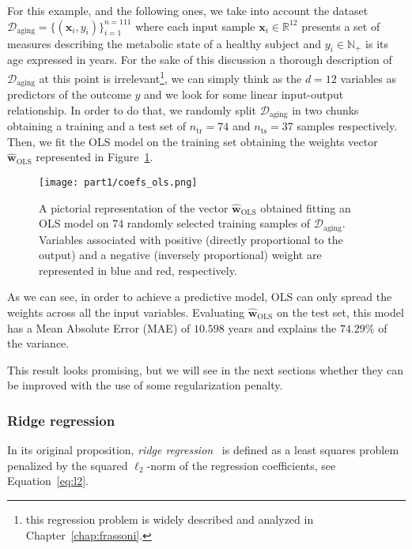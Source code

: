 			For this example, and the following ones, we take into account the dataset $\mathcal{D}_{\text{aging}} = \{(\bm{x}_i, y_i)\}_{i=1}^{n=111}$ where each input sample $\bm{x}_i \in \mathbb{R}^{12}$ presents a set of measures describing the metabolic state of a healthy subject and $y_i \in \mathbb{N}_+$ is its age expressed in years.
			For the sake of this discussion a  thorough description of $\mathcal{D}_{\text{aging}}$ at this point is irrelevant\footnote{this regression problem is widely described and analyzed in Chapter~\ref{chap:frassoni}.}, we can simply think as the $d=12$ variables as predictors of the outcome $y$ and we look for some linear input-output relationship.
			In order to do that, we randomly split $\mathcal{D}_{\text{aging}}$ in two chunks obtaining a training and a test set of $n_{\text{tr}}=74$ and $n_{\text{ts}}=37$ samples respectively. Then, we fit the OLS model on the training set obtaining the weights vector $\bm{\hat w}_{\text{OLS}}$ represented in Figure~\ref{fig:coefs_ols}.
			\begin{figure}[!h]
				\centering
				\texttt{[image: part1/coefs\_ols.png]}
				\caption{A pictorial representation of the vector $\bm{\hat w}_{\text{OLS}}$ obtained fitting an OLS model on $74$ randomly selected training samples of $\mathcal{D}_{\text{aging}}$. Variables associated with positive (\ie directly proportional to the output) and a negative (\ie inversely proportional) weight are represented in blue and red, respectively.} \label{fig:coefs_ols}
		  \end{figure}
			As we can see, in order to achieve a predictive model, OLS can only spread the weights across all the input variables. Evaluating $\bm{\hat w}_{\text{OLS}}$ on the test set, this model has a Mean Absolute Error (\ac{MAE}) of $10.598$ years and explains the $74.29\%$ of the variance.

			This result looks promising, but we will see in the next sections whether they can be improved with the use of some regularization penalty.


			\subsubsection{Ridge regression} \label{sec:ridge_regression}
			In its original proposition, \textit{ridge regression}~\cite{hoerl1970ridge} is defined as a least squares problem penalized by the squared $\ell_2$-norm of the regression coefficients, see Equation~\eqref{eq:l2}.


